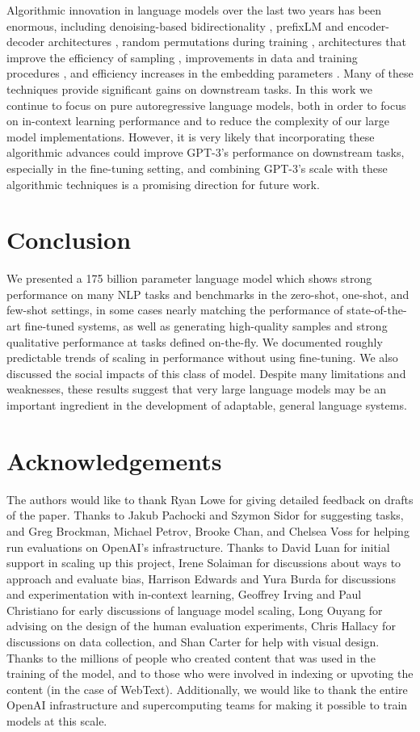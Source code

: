 \documentclass{article}
\begin{document}
Algorithmic innovation in language models over the last two years has been enormous, including denoising-based bidirectionality \cite{devlin2018bert}, prefixLM \cite{dai2015semi} and encoder-decoder architectures \cite{lewis2019bart,raffel2019t5}, random permutations during training \cite{yang2019xlnet}, architectures that improve the efficiency of sampling \cite{dai2019transformerXL}, improvements in data and training procedures \cite{liu2019roberta}, and efficiency increases in the embedding parameters \cite{lan2019albert}.  Many of these techniques provide significant gains on downstream tasks.  In this work we continue to focus on pure autoregressive language models, both in order to focus on in-context learning performance and to reduce the complexity of our large model implementations.  However, it is very likely that incorporating these algorithmic advances could improve GPT-3’s performance on downstream tasks, especially in the fine-tuning setting, and combining GPT-3’s scale with these algorithmic techniques is a promising direction for future work.
     
    

\section{Conclusion}
\label{section:Conclusion}
We presented a 175 billion parameter language model which shows strong performance on many NLP tasks and benchmarks in the zero-shot, one-shot, and few-shot settings, in some cases nearly matching the performance of state-of-the-art fine-tuned systems, as well as generating high-quality samples and strong qualitative performance at tasks defined on-the-fly.  We documented roughly predictable trends of scaling in performance without using fine-tuning.  We also discussed the social impacts of this class of model.  Despite many limitations and weaknesses, these results suggest that very large language models may be an important ingredient in the development of adaptable, general language systems. 
\section*{Acknowledgements}
The authors would like to thank Ryan Lowe for giving detailed feedback on drafts of the paper.  Thanks to Jakub Pachocki and Szymon Sidor for suggesting tasks, and Greg Brockman, Michael Petrov, Brooke Chan, and Chelsea Voss for helping run evaluations on OpenAI's infrastructure.  Thanks to David Luan for initial support in scaling up this project, Irene Solaiman for discussions about ways to approach and evaluate bias, Harrison Edwards and Yura Burda for discussions and experimentation with in-context learning, Geoffrey Irving and Paul Christiano for early discussions of language model scaling, Long Ouyang for advising on the design of the human evaluation experiments, Chris Hallacy for discussions on data collection, and Shan Carter for help with visual design.  Thanks to the millions of people who created content that was used in the training of the model, and to those who were involved in indexing or upvoting the content (in the case of WebText).  Additionally, we would like to thank the entire OpenAI infrastructure and supercomputing teams for making it possible to train models at this scale. \newpage
\end{document}
